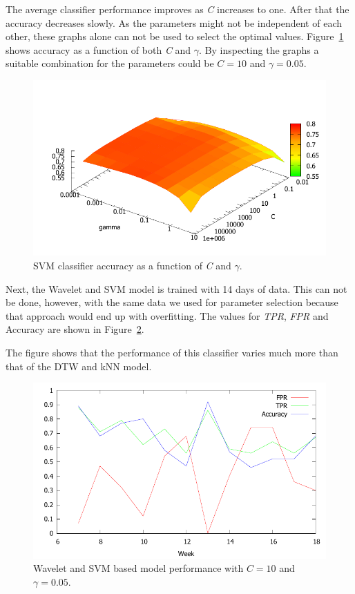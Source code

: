 The average classifier performance improves as \emph{C} increases to one. After that the accuracy decreases slowly. As the parameters might not be independent of each other, these graphs alone can not be used to select the optimal values. Figure~\ref{fig:co2_svm} shows accuracy as a function of both \emph{C} and $\gamma$. By inspecting the graphs a suitable combination for the parameters could be $C = 10$ and $\gamma = 0.05$. 

\begin{center}
\begin{figure}[h!]
\includegraphics[scale=1.0]{images/co2_svm.pdf}
\caption{SVM classifier accuracy as a function of \emph{C} and $\gamma$.}
\label{fig:co2_svm}
\end{figure}
\end{center}

Next, the Wavelet and SVM model is trained with 14 days of data. This can not be done, however, with the same data we used for parameter selection because that approach would end up with overfitting. The values for \emph{TPR}, \emph{FPR} and Accuracy are shown in Figure~\ref{fig:co2_waveletsvm_test}.

The figure shows that the performance of this classifier varies much more than that of the DTW and kNN model.

\begin{center}
\begin{figure}[h!]
\includegraphics[scale=1.0]{images/co2_waveletsvm_test.pdf}
\caption{Wavelet and SVM based model performance with $C = 10$ and $\gamma = 0.05$.}
\label{fig:co2_waveletsvm_test}
\end{figure}
\end{center}



